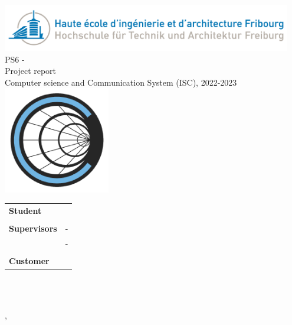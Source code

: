 
\begin{titlepage}
{\selectfont
    \begin{center}
	    \includegraphics[width=0.95\textwidth]{05-resources/img/heiafr_logo}
		~\\[1.5cm]
		{
			\Huge
			PS6 - \ThesisTitle\\Project report \\[0.5cm]
			\large Computer science and Communication System (ISC), 2022-2023\\[2cm]
		}
		\includegraphics[width=0.35\textwidth]{05-resources/img/logo.png}
		~\\[2cm]
		{
			\begin{center}
			\begin{tabularx}{\textwidth} { %
				>{\raggedright\arraybackslash}X
				>{\raggedright\arraybackslash}X  }
					 \textbf{Student} & \Author\\
					 & \\
					 \textbf{Supervisors} & \Advisor \space - \AdvisorSchool \\ & \AdvisorTwo \space - \AdvisorTwoSchool \\
					 & \\
					 \textbf{Customer} & \Mendant\\
			\end{tabularx}
			\end{center}
			~\\[1.5cm]
		}

		\vfill



	    {\reportVersion}\\
		{\large \Place, \Date}

	\end{center}
}
\restoregeometry
\end{titlepage}




